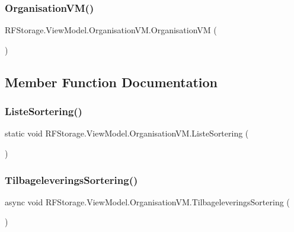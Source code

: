 \subsubsection{OrganisationVM()}
{\footnotesize\ttfamily R\+F\+Storage.\+View\+Model.\+Organisation\+V\+M.\+Organisation\+VM (\begin{DoxyParamCaption}{ }\end{DoxyParamCaption})}







\subsection{Member Function Documentation}
\mbox{\label{class_r_f_storage_1_1_view_model_1_1_organisation_v_m_a6a8f7bb9ab51cb0291e3fa3e23bdb6f6}} 
\subsubsection{ListeSortering()}
{\footnotesize\ttfamily static void R\+F\+Storage.\+View\+Model.\+Organisation\+V\+M.\+Liste\+Sortering (\begin{DoxyParamCaption}{ }\end{DoxyParamCaption})\hspace{0.3cm}{\ttfamily [static]}}





\mbox{\label{class_r_f_storage_1_1_view_model_1_1_organisation_v_m_a3c6fd198321166706a88a326d6a80334}} 
\subsubsection{TilbageleveringsSortering()}
{\footnotesize\ttfamily async void R\+F\+Storage.\+View\+Model.\+Organisation\+V\+M.\+Tilbageleverings\+Sortering (\begin{DoxyParamCaption}{ }\end{DoxyParamCaption})}





